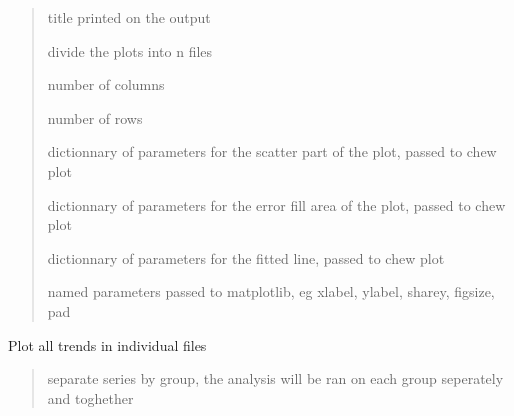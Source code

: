 \documentclass[letterpaper,10pt,english]{sphinxmanual}
\begin{document}
\begin{fulllineitems}
\begin{fulllineitems}
\begin{quote}
\begin{description}
\sphinxAtStartPar
title printed on the output

\sphinxAtStartPar
divide the plots into n files

\sphinxAtStartPar
number of columns

\sphinxAtStartPar
number of rows

\sphinxAtStartPar
dictionnary of parameters for the scatter part of the plot, passed to chew plot

\sphinxAtStartPar
dictionnary of parameters for the error fill area of the plot, passed to chew plot

\sphinxAtStartPar
dictionnary of parameters for the fitted line, passed to chew plot

\sphinxAtStartPar
named parameters passed to matplotlib, eg xlabel, ylabel, sharey, figsize, pad

\end{description}\end{quote}

\end{fulllineitems}


\begin{fulllineitems}
\label{\detokenize{source/chowclassifier:chowclassifier.chow.ChewData.plot_by_group}}
\pysigstartsignatures
{}
\pysigstopsignatures
\sphinxAtStartPar
Plot all trends in individual files
\begin{quote}\begin{description}
\sphinxAtStartPar
separate series by group, the analysis will be ran on each group seperately and toghether


\end{description}
\end{quote}
\end{fulllineitems}
\end{fulllineitems}
\end{document}
